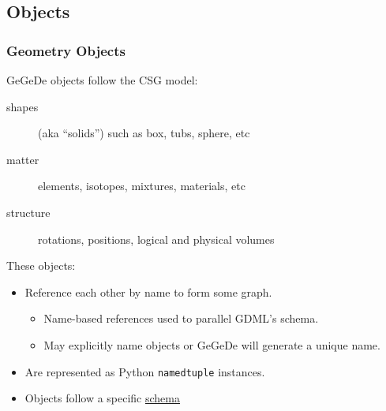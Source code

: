 \documentclass[10pt,xcolor=dvipsnames]{beamer}
\begin{document}
\subsection{Objects}

\begin{frame}
  \frametitle{Geometry Objects} 

  GeGeDe objects follow the CSG model:
  \begin{description}
  \item[shapes] (aka ``solids'') such as box, tubs, sphere, etc
  \item[matter] elements, isotopes, mixtures, materials, etc
  \item[structure] rotations, positions, logical and physical volumes
  \end{description}

  These objects:
  \begin{itemize}
  \item Reference each other by name to form some graph.
    \begin{itemize}\footnotesize
    \item Name-based references used to parallel GDML's schema.
    \item May explicitly name objects or GeGeDe will generate a unique name.
    \end{itemize}
  \item Are represented as Python \texttt{namedtuple} instances.
  \item Objects follow a specific
    \href{https://github.com/brettviren/gegede/blob/master/python/gegede/schema/__init__.py}{schema}
  \end{itemize}
\end{frame}
\end{document}
